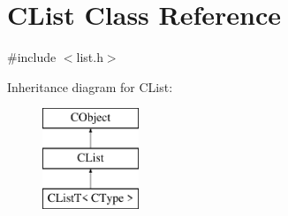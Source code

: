\hypertarget{class_c_list}{\section{C\-List Class Reference}
\label{class_c_list}
}


{\ttfamily \#include $<$list.\-h$>$}

Inheritance diagram for C\-List\-:\begin{figure}[H]
\begin{center}
\leavevmode
\includegraphics[height=3.000000cm]{df/db6/class_c_list}
\end{center}
\end{figure}
